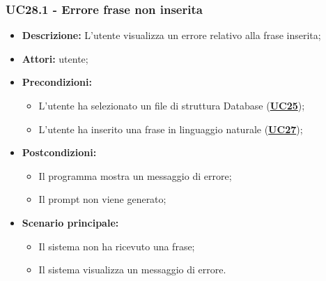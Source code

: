 \subsubsection{UC28.1 - Errore frase non inserita}
\label{sec:UC28.1}
\begin{itemize}
	\item \textbf{Descrizione:} L’utente visualizza un errore relativo alla frase inserita;
	\item \textbf{Attori:} utente;
	\item \textbf{Precondizioni:} 
	\begin{itemize}
		\item L’utente ha selezionato un file di struttura Database (\hyperref[sec:UC25]{\textbf{UC25}});
		\item L'utente ha inserito una frase in linguaggio naturale (\hyperref[sec:UC27]{\textbf{UC27}});
	\end{itemize}
	\item \textbf{Postcondizioni:} 
	\begin{itemize}
		\item Il programma mostra un messaggio di errore;
		\item Il prompt non viene generato;
	\end{itemize}
	\item \textbf{Scenario principale:} 
	\begin{itemize}
		\item Il sistema non ha ricevuto una frase;
		\item Il sistema visualizza un messaggio di errore.
	\end{itemize}
\end{itemize}


